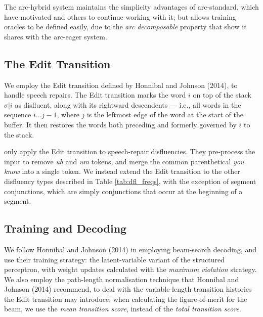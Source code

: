 \documentclass[11pt,letterpaper]{article}
\begin{document}
The arc-hybrid system maintains the simplicity advantages of arc-standard, which
have motivated \citet{huang:10} and others to continue working with it; but allows
training oracles to be defined easily, due to the \emph{arc decomposable}
property that \citet{goldberg:13} show it shares with the arc-eager system.

\subsection{The Edit Transition}

We employ the Edit transition defined by Honnibal and Johnson (2014), to handle
speech repairs.
The Edit transition marks the word $i$ on top of the stack $\sigma | i$ as
disfluent, along with its rightward descendents --- i.e., all words in the
sequence $i...j-1$, where $j$ is the leftmost edge of the word at the start of
the buffer. It then restores the words both preceding and formerly governed by
$i$ to the stack.


\citet{honnibal:14} only apply the Edit transition to speech-repair disfluencies.
They pre-process the input to remove \emph{uh} and \emph{um} tokens, and merge
the common parenthetical \emph{you know} into a single token.
We instead extend the Edit transition to the other disfluency types described
in Table \ref{tab:dfl_freqs}, with the exception of segment conjunctions, which
are simply conjunctions that occur at the beginning of a segment.

\subsection{Training and Decoding}

We follow Honnibal and Johnson (2014) in employing beam-search decoding, and
use their training strategy: the \citet{sun:09} latent-variable
variant of the \citet{collins:02} structured perceptron, with weight updates
calculated with the \citet{huang:12} \emph{maximum violation} strategy.  We
also employ the path-length normalisation technique that Honnibal and Johnson (2014)
recommend, to deal with the variable-length transition histories the Edit transition
may introduce: 
when calculating the figure-of-merit for the beam, we use the
\emph{mean transition score}, instead of the \emph{total transition score}.
\end{document}
